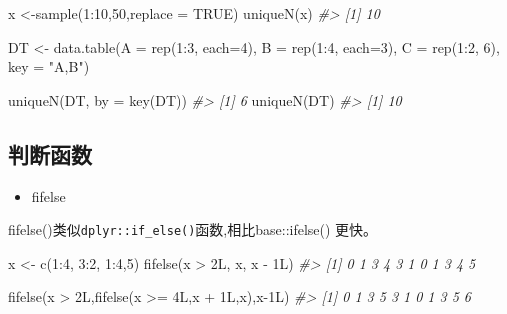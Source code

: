 \documentclass[
]{book}
\newenvironment{Shaded}{\begin{snugshade}}{\end{snugshade}}
\newcommand{\AttributeTok}[1]{\textcolor[rgb]{0.77,0.63,0.00}{#1}}
\newcommand{\CommentTok}[1]{\textcolor[rgb]{0.56,0.35,0.01}{\textit{#1}}}
\newcommand{\ConstantTok}[1]{\textcolor[rgb]{0.00,0.00,0.00}{#1}}
\newcommand{\DecValTok}[1]{\textcolor[rgb]{0.00,0.00,0.81}{#1}}
\newcommand{\FunctionTok}[1]{\textcolor[rgb]{0.00,0.00,0.00}{#1}}
\newcommand{\NormalTok}[1]{#1}
\newcommand{\OtherTok}[1]{\textcolor[rgb]{0.56,0.35,0.01}{#1}}
\newcommand{\SpecialCharTok}[1]{\textcolor[rgb]{0.00,0.00,0.00}{#1}}
\newcommand{\StringTok}[1]{\textcolor[rgb]{0.31,0.60,0.02}{#1}}
\providecommand{\tightlist}{%
  \setlength{\itemsep}{0pt}\setlength{\parskip}{0pt}}
\begin{document}
\begin{Shaded}
\begin{Highlighting}[]
\NormalTok{x }\OtherTok{\textless{}{-}}\FunctionTok{sample}\NormalTok{(}\DecValTok{1}\SpecialCharTok{:}\DecValTok{10}\NormalTok{,}\DecValTok{50}\NormalTok{,}\AttributeTok{replace =} \ConstantTok{TRUE}\NormalTok{)}
\FunctionTok{uniqueN}\NormalTok{(x)}
\CommentTok{\#\textgreater{} [1] 10}

\NormalTok{DT }\OtherTok{\textless{}{-}} \FunctionTok{data.table}\NormalTok{(}\AttributeTok{A =} \FunctionTok{rep}\NormalTok{(}\DecValTok{1}\SpecialCharTok{:}\DecValTok{3}\NormalTok{, }\AttributeTok{each=}\DecValTok{4}\NormalTok{), }\AttributeTok{B =} \FunctionTok{rep}\NormalTok{(}\DecValTok{1}\SpecialCharTok{:}\DecValTok{4}\NormalTok{, }\AttributeTok{each=}\DecValTok{3}\NormalTok{),}
                 \AttributeTok{C =} \FunctionTok{rep}\NormalTok{(}\DecValTok{1}\SpecialCharTok{:}\DecValTok{2}\NormalTok{, }\DecValTok{6}\NormalTok{), }\AttributeTok{key =} \StringTok{"A,B"}\NormalTok{)}

\FunctionTok{uniqueN}\NormalTok{(DT, }\AttributeTok{by =} \FunctionTok{key}\NormalTok{(DT))}
\CommentTok{\#\textgreater{} [1] 6}
\FunctionTok{uniqueN}\NormalTok{(DT)}
\CommentTok{\#\textgreater{} [1] 10}
\end{Highlighting}
\end{Shaded}

\hypertarget{ux5224ux65adux51fdux6570}{%
\subsection{判断函数}\label{ux5224ux65adux51fdux6570}}

\begin{itemize}
\tightlist
\item
  fifelse
\end{itemize}

fifelse()类似\texttt{dplyr::if\_else()}函数,相比base::ifelse() 更快。

\begin{Shaded}
\begin{Highlighting}[]
\NormalTok{x }\OtherTok{\textless{}{-}}  \FunctionTok{c}\NormalTok{(}\DecValTok{1}\SpecialCharTok{:}\DecValTok{4}\NormalTok{, }\DecValTok{3}\SpecialCharTok{:}\DecValTok{2}\NormalTok{, }\DecValTok{1}\SpecialCharTok{:}\DecValTok{4}\NormalTok{,}\DecValTok{5}\NormalTok{)}
\FunctionTok{fifelse}\NormalTok{(x }\SpecialCharTok{\textgreater{}}\NormalTok{ 2L, x, x }\SpecialCharTok{{-}}\NormalTok{ 1L)}
\CommentTok{\#\textgreater{}  [1] 0 1 3 4 3 1 0 1 3 4 5}

\FunctionTok{fifelse}\NormalTok{(x }\SpecialCharTok{\textgreater{}}\NormalTok{ 2L,}\FunctionTok{fifelse}\NormalTok{(x }\SpecialCharTok{\textgreater{}=}\NormalTok{ 4L,x }\SpecialCharTok{+}\NormalTok{ 1L,x),x}\SpecialCharTok{{-}}\NormalTok{1L)}
\CommentTok{\#\textgreater{}  [1] 0 1 3 5 3 1 0 1 3 5 6}
\end{Highlighting}
\end{Shaded}
\end{document}
